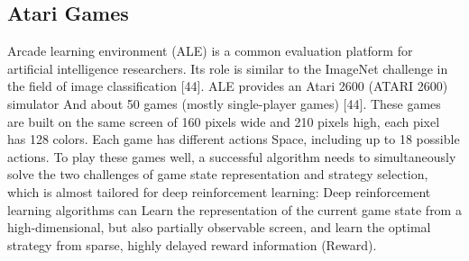 \documentclass[11pt,en]{elegantpaper}
\begin{document}
\subsection{Atari Games}
Arcade learning environment (ALE) is a common evaluation platform for artificial intelligence researchers. Its role is similar to the ImageNet challenge in the field of image classification [44]. ALE provides an Atari 2600 (ATARI 2600) simulator And about 50 games (mostly single-player games) [44]. These games are built on the same screen of 160 pixels wide and 210 pixels high, each pixel has 128 colors. Each game has different actions Space, including up to 18 possible actions. To play these games well, a successful algorithm needs to simultaneously solve the two challenges of game state representation and strategy selection, which is almost tailored for deep reinforcement learning: Deep reinforcement learning algorithms can Learn the representation of the current game state from a high-dimensional, but also partially observable screen, and learn the optimal strategy from sparse, highly delayed reward information (Reward).



\end{document}
